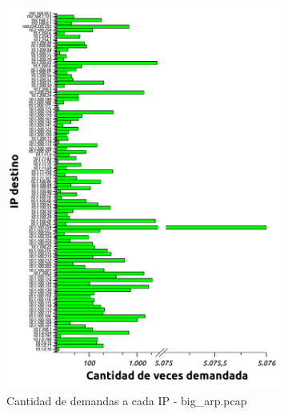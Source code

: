 \begin{figure}[H]
        \begin{subfigure}[H]{0.5\textwidth}
                \centering
                \includegraphics[width=1\textwidth]{graficos/cantidadConsultasBig.pdf}
                \caption{Cantidad de demandas a cada IP - big\_arp.pcap}
                \label{fig:hist3}
        \end{subfigure}
        \begin{subfigure}[H]{0.5\textwidth}
                \centering

\end{subfigure}
\end{figure}
